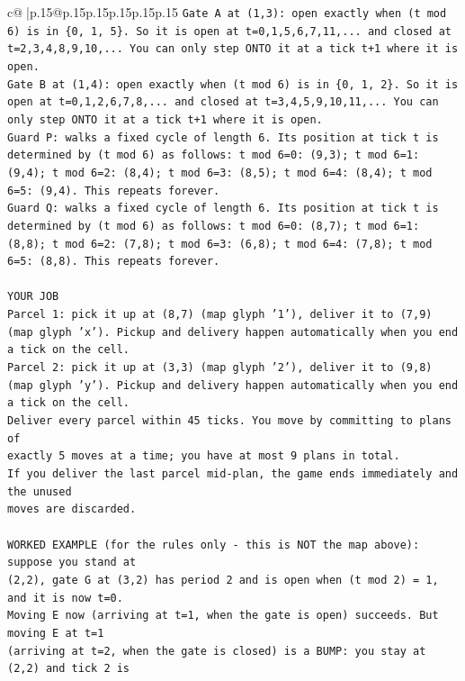 \documentclass{article}
\begin{document}
{\begin{supertabular}{c@{$\;$}|p{.15\linewidth}@{}p{.15\linewidth}p{.15\linewidth}p{.15\linewidth}p{.15\linewidth}p{.15\linewidth}}
{{{\texttt{Gate A at (1,3): open exactly when (t mod 6) is in \{0, 1, 5\}. So it is open at t=0,1,5,6,7,11,... and closed at t=2,3,4,8,9,10,... You can only step ONTO it at a tick t+1 where it is open.} \\
\texttt{Gate B at (1,4): open exactly when (t mod 6) is in \{0, 1, 2\}. So it is open at t=0,1,2,6,7,8,... and closed at t=3,4,5,9,10,11,... You can only step ONTO it at a tick t+1 where it is open.} \\
\texttt{Guard P: walks a fixed cycle of length 6. Its position at tick t is determined by (t mod 6) as follows: t mod 6=0: (9,3); t mod 6=1: (9,4); t mod 6=2: (8,4); t mod 6=3: (8,5); t mod 6=4: (8,4); t mod 6=5: (9,4). This repeats forever.} \\
\texttt{Guard Q: walks a fixed cycle of length 6. Its position at tick t is determined by (t mod 6) as follows: t mod 6=0: (8,7); t mod 6=1: (8,8); t mod 6=2: (7,8); t mod 6=3: (6,8); t mod 6=4: (7,8); t mod 6=5: (8,8). This repeats forever.} \\
\\ 
\texttt{YOUR JOB} \\
\texttt{Parcel 1: pick it up at (8,7) (map glyph '1'), deliver it to (7,9) (map glyph 'x'). Pickup and delivery happen automatically when you end a tick on the cell.} \\
\texttt{Parcel 2: pick it up at (3,3) (map glyph '2'), deliver it to (9,8) (map glyph 'y'). Pickup and delivery happen automatically when you end a tick on the cell.} \\
\texttt{Deliver every parcel within 45 ticks. You move by committing to plans of} \\
\texttt{exactly 5 moves at a time; you have at most 9 plans in total.} \\
\texttt{If you deliver the last parcel mid{-}plan, the game ends immediately and the unused} \\
\texttt{moves are discarded.} \\
\\ 
\texttt{WORKED EXAMPLE (for the rules only {-} this is NOT the map above): suppose you stand at} \\
\texttt{(2,2), gate G at (3,2) has period 2 and is open when (t mod 2) = 1, and it is now t=0.} \\
\texttt{Moving E now (arriving at t=1, when the gate is open) succeeds. But moving E at t=1} \\
\texttt{(arriving at t=2, when the gate is closed) is a BUMP: you stay at (2,2) and tick 2 is} \\
}}}
\end{supertabular}}
\end{document}
